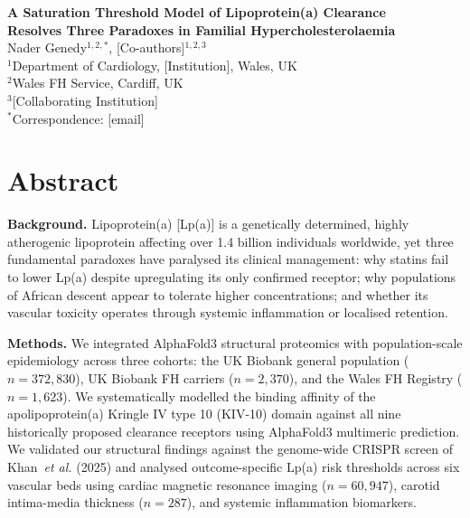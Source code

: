 \documentclass[11pt,a4paper]{article}
\newcommand{\lpa}{Lp(a)}
\newcommand{\kiv}{KIV-10}
\newcommand{\ukb}{UK Biobank}
\newcommand{\fh}{FH}
\begin{document}
\begin{center}
{\LARGE\bfseries A Saturation Threshold Model of Lipoprotein(a) Clearance\\[4pt]
Resolves Three Paradoxes in Familial Hypercholesterolaemia}\\[16pt]
{\large
Nader Genedy$^{1,2,*}$, [Co-authors]$^{1,2,3}$}\\[8pt]
{\small
$^1$Department of Cardiology, [Institution], Wales, UK\\
$^2$Wales FH Service, Cardiff, UK\\
$^3$[Collaborating Institution]\\[4pt]
$^*$Correspondence: [email]}
\end{center}

\vspace{12pt}

\section*{Abstract}

\textbf{Background.}
Lipoprotein(a) [\lpa{}] is a genetically determined, highly atherogenic lipoprotein affecting over 1.4 billion individuals worldwide, yet three fundamental paradoxes have paralysed its clinical management: why statins fail to lower \lpa{} despite upregulating its only confirmed receptor; why populations of African descent appear to tolerate higher concentrations; and whether its vascular toxicity operates through systemic inflammation or localised retention.

\textbf{Methods.}
We integrated AlphaFold3 structural proteomics with population-scale epidemiology across three cohorts: the \ukb{} general population ($n = 372{,}830$), \ukb{} \fh{} carriers ($n = 2{,}370$), and the Wales \fh{} Registry ($n = 1{,}623$). We systematically modelled the binding affinity of the apolipoprotein(a) Kringle IV type 10 (\kiv{}) domain against all nine historically proposed clearance receptors using AlphaFold3 multimeric prediction. We validated our structural findings against the genome-wide CRISPR screen of Khan~\textit{et al.} (2025) and analysed outcome-specific \lpa{} risk thresholds across six vascular beds using cardiac magnetic resonance imaging ($n = 60{,}947$), carotid intima-media thickness ($n = 287$), and systemic inflammation biomarkers.
\end{document}
